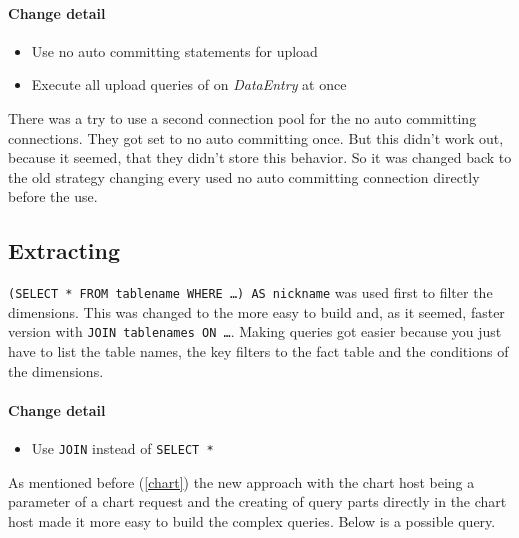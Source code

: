 \paragraph{Change detail} 
\begin{itemize}
  \item Use no auto committing statements for upload
  \item Execute all upload queries of on \textit{DataEntry} at once
\end{itemize}

There was a try to use a second connection pool for the no auto committing connections.
They got set to no auto committing once. But this didn't work out, because it seemed,
that they didn't store this behavior. So it was changed back to the old strategy
changing every used no auto committing connection directly before the use.

\pagebreak[4]
\subsection{Extracting}
\texttt{(SELECT * FROM tablename WHERE \ldots) AS nickname} was used first to filter the dimensions.
This was changed to the more easy to build and, as it seemed, faster version with
\texttt{JOIN tablenames ON \ldots}. Making queries got easier because you just have to
list the table names, the key filters to the fact table and the conditions of the dimensions.

\paragraph{Change detail} 
\begin{itemize}
  \item Use \texttt{JOIN} instead of \texttt{SELECT *}
\end{itemize}

As mentioned before (\ref{chart}) the new approach with the chart host being a parameter
of a chart request and the creating of query parts directly in the chart host
made it more easy to build the complex queries. Below is a possible query.

